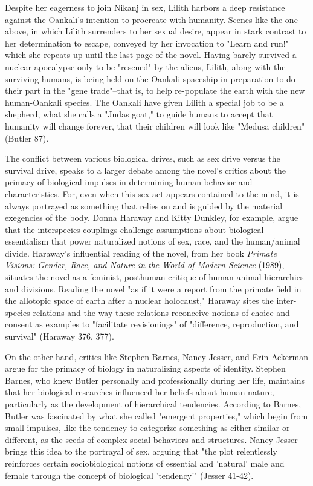 \documentclass[11pt]{article}
\begin{document}
Despite her eagerness to join Nikanj in sex, Lilith harbors a deep
resistance against the Oankali's intention to procreate with
humanity. Scenes like the one above, in which Lilith surrenders to her
sexual desire, appear in stark contrast to her determination to
escape, conveyed by her invocation to "Learn and run!" which she
repeats up until the last page of the novel. Having barely survived a
nuclear apocalypse only to be "rescued" by the aliens, Lilith, along
with the surviving humans, is being held on the Oankali spaceship in
preparation to do their part in the "gene trade"--that is, to help
re-populate the earth with the new human-Oankali species. The Oankali
have given Lilith a special job to be a shepherd, what she calls a
"Judas goat," to guide humans to accept that humanity will change
forever, that their children will look like "Medusa children" (Butler
87).

The conflict between various biological drives, such as sex drive
versus the survival drive, speaks to a larger debate among the novel's
critics about the primacy of biological impulses in determining human
behavior and characteristics. For, even when this sex act appears
contained to the mind, it is always portrayed as something that relies
on and is guided by the material exegencies of the body. Donna Haraway
and Kitty Dunkley, for example, argue that the interspecies couplings
challenge assumptions about biological essentialism that power
naturalized notions of sex, race, and the human/animal
divide. Haraway's influential reading of the novel, from her book
\emph{Primate Visions: Gender, Race, and Nature in the World of Modern
Science} (1989), situates the novel as a feminist, posthuman critique
of human-animal hierarchies and divisions. Reading the novel "as if it
were a report from the primate field in the allotopic space of earth
after a nuclear holocaust," Haraway sites the inter-species relations
and the way these relations reconceive notions of choice and consent
as examples to "facilitate revisionings" of "difference, reproduction,
and survival" (Haraway 376, 377). 

On the other hand, critics like Stephen Barnes, Nancy Jesser, and Erin
Ackerman argue for the primacy of biology in naturalizing aspects of
identity. Stephen Barnes, who knew Butler personally and
professionally during her life, maintains that her biological
researches influenced her beliefs about human nature, particularly as
the development of hierarchical tendencies. According to Barnes,
Butler was fascinated by what she called "emergent properties," which
begin from small impulses, like the tendency to categorize something
as either similar or different, as the seeds of complex social
behaviors and structures. Nancy Jesser brings this idea to the
portrayal of sex, arguing that "the plot relentlessly reinforces
certain sociobiological notions of essential and 'natural' male and
female through the concept of biological 'tendency'" (Jesser
41-42). 
\end{document}
